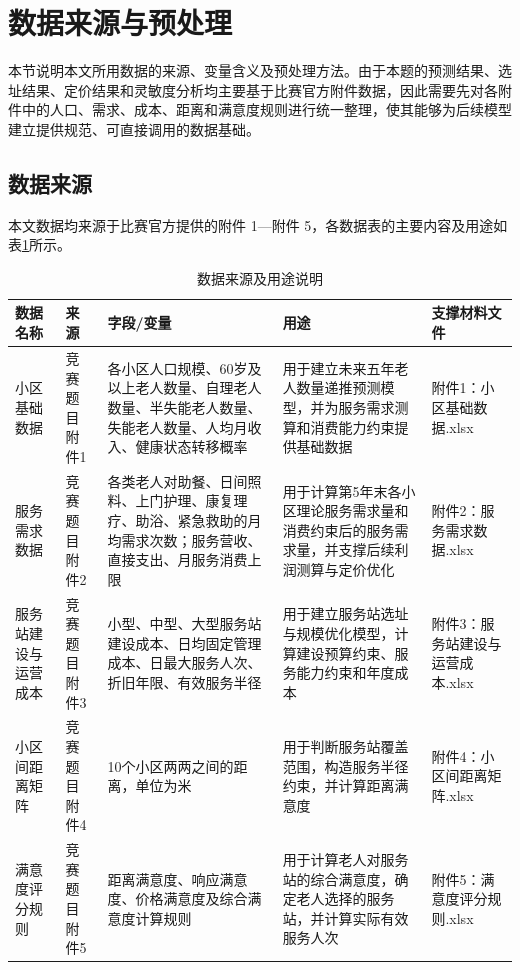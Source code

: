 \documentclass[UTF8]{ctexart}
\begin{document}
\section{数据来源与预处理}

本节说明本文所用数据的来源、变量含义及预处理方法。由于本题的预测结果、选址结果、定价结果和灵敏度分析均主要基于比赛官方附件数据，因此需要先对各附件中的人口、需求、成本、距离和满意度规则进行统一整理，使其能够为后续模型建立提供规范、可直接调用的数据基础。

\subsection{数据来源}

本文数据均来源于比赛官方提供的附件 1—附件 5，各数据表的主要内容及用途如表\ref{tab:data_sources}所示。

\begin{table}[H]
\centering
\caption{数据来源及用途说明}
\label{tab:data_sources}
\renewcommand{\arraystretch}{1.4}
\begin{tabular}{|p{2.8cm}|p{2.2cm}|p{3.2cm}|p{2.5cm}|p{2.5cm}|}
\hline
\textbf{数据名称} & \textbf{来源} & \textbf{字段/变量} & \textbf{用途} & \textbf{支撑材料文件} \\
\hline
小区基础数据 & 竞赛题目附件1 & 各小区人口规模、60岁及以上老人数量、自理老人数量、半失能老人数量、失能老人数量、人均月收入、健康状态转移概率 & 用于建立未来五年老人数量递推预测模型，并为服务需求测算和消费能力约束提供基础数据 & 附件1：小区基础数据.xlsx \\
\hline
服务需求数据 & 竞赛题目附件2 & 各类老人对助餐、日间照料、上门护理、康复理疗、助浴、紧急救助的月均需求次数；服务营收、直接支出、月服务消费上限 & 用于计算第5年末各小区理论服务需求量和消费约束后的服务需求量，并支撑后续利润测算与定价优化 & 附件2：服务需求数据.xlsx \\
\hline
服务站建设与运营成本 & 竞赛题目附件3 & 小型、中型、大型服务站建设成本、日均固定管理成本、日最大服务人次、折旧年限、有效服务半径 & 用于建立服务站选址与规模优化模型，计算建设预算约束、服务能力约束和年度成本 & 附件3：服务站建设与运营成本.xlsx \\
\hline
小区间距离矩阵 & 竞赛题目附件4 & 10个小区两两之间的距离，单位为米 & 用于判断服务站覆盖范围，构造服务半径约束，并计算距离满意度 & 附件4：小区间距离矩阵.xlsx \\
\hline
满意度评分规则 & 竞赛题目附件5 & 距离满意度、响应满意度、价格满意度及综合满意度计算规则 & 用于计算老人对服务站的综合满意度，确定老人选择的服务站，并计算实际有效服务人次 & 附件5：满意度评分规则.xlsx \\
\hline
\end{tabular}
\end{table}
\end{document}
